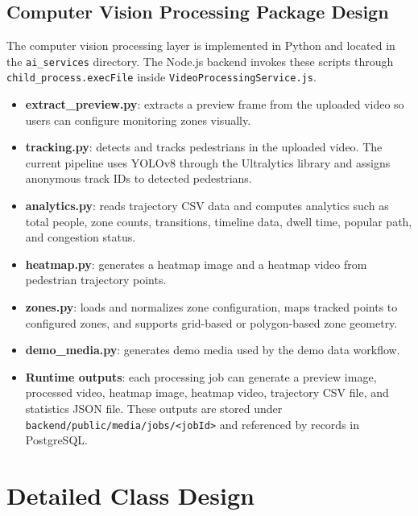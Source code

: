\documentclass[12pt,a4paper]{report}
\begin{document}
\subsection{Computer Vision Processing Package Design}

The computer vision processing layer is implemented in Python and located in the \texttt{ai\_services} directory. The Node.js backend invokes these scripts through \texttt{child\_process.execFile} inside \texttt{VideoProcessingService.js}.

\begin{itemize}
    \item \textbf{extract\_preview.py}: extracts a preview frame from the uploaded video so users can configure monitoring zones visually.
    
    \item \textbf{tracking.py}: detects and tracks pedestrians in the uploaded video. The current pipeline uses YOLOv8 through the Ultralytics library and assigns anonymous track IDs to detected pedestrians.
    
    \item \textbf{analytics.py}: reads trajectory CSV data and computes analytics such as total people, zone counts, transitions, timeline data, dwell time, popular path, and congestion status.
    
    \item \textbf{heatmap.py}: generates a heatmap image and a heatmap video from pedestrian trajectory points.
    
    \item \textbf{zones.py}: loads and normalizes zone configuration, maps tracked points to configured zones, and supports grid-based or polygon-based zone geometry.
    
    \item \textbf{demo\_media.py}: generates demo media used by the demo data workflow.
    
    \item \textbf{Runtime outputs}: each processing job can generate a preview image, processed video, heatmap image, heatmap video, trajectory CSV file, and statistics JSON file. These outputs are stored under \texttt{backend/public/media/jobs/<jobId>} and referenced by records in PostgreSQL.
\end{itemize}

\section{Detailed Class Design}
\end{document}
